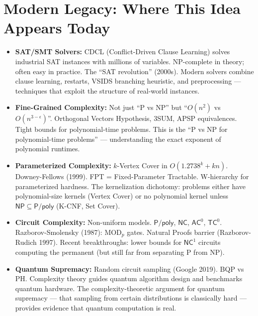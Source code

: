 \section{Modern Legacy: Where This Idea Appears Today}
\label{sec:complexity:legacy}

\begin{itemize}
\item \textbf{SAT/SMT Solvers:} CDCL (Conflict-Driven Clause Learning) solves industrial SAT instances with millions of variables. NP-complete in theory; often easy in practice. The ``SAT revolution'' (2000s). Modern solvers combine clause learning, restarts, VSIDS branching heuristic, and preprocessing — techniques that exploit the structure of real-world instances.

\item \textbf{Fine-Grained Complexity:} Not just ``P vs NP'' but ``$O(n^2)$ vs $O(n^{3-\epsilon})$''. Orthogonal Vectors Hypothesis, 3SUM, APSP equivalences. Tight bounds for polynomial-time problems. This is the ``P vs NP for polynomial-time problems'' — understanding the exact exponent of polynomial runtimes.

\item \textbf{Parameterized Complexity:} $k$-Vertex Cover in $O(1.2738^k + kn)$. Downey-Fellows (1999). FPT = Fixed-Parameter Tractable. W-hierarchy for parameterized hardness. The kernelization dichotomy: problems either have polynomial-size kernels (Vertex Cover) or no polynomial kernel unless $\mathsf{NP} \subseteq \mathsf{P/poly}$ (K-CNF, Set Cover).

\item \textbf{Circuit Complexity:} Non-uniform models. $\mathsf{P}/\mathsf{poly}$, $\mathsf{NC}$, $\mathsf{AC}^0$, $\mathsf{TC}^0$. Razborov-Smolensky (1987): MOD$_p$ gates. Natural Proofs barrier (Razborov-Rudich 1997). Recent breakthroughs: lower bounds for $\mathsf{NC}^1$ circuits computing the permanent (but still far from separating P from NP).

\item \textbf{Quantum Supremacy:} Random circuit sampling (Google 2019). BQP vs PH. Complexity theory guides quantum algorithm design and benchmarks quantum hardware. The complexity-theoretic argument for quantum supremacy — that sampling from certain distributions is classically hard — provides evidence that quantum computation is real.


\end{itemize}
